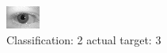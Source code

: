 \begin{figure}[h!]
\begin{center}
\includegraphics[width=0.60\columnwidth]{figures/ID659_class_2_target_3.png}
\end{center}
\caption{ Classification: 2 actual target: 3}
\label{fig:ID659_class_2_target_3}
\end{figure}
